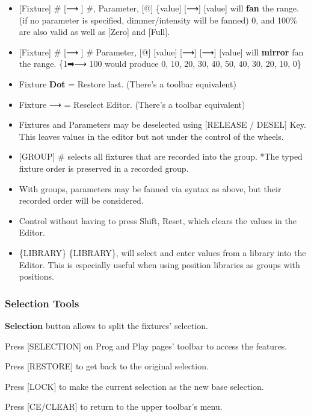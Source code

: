 \documentclass[
]{article}
\begin{document}
\begin{itemize}
\item
  {[}Fixture{]} \# {[}⟶ {]} \#, Parameter, {[}@{]} \{value{]} {[}⟶{]} {[}value{]} will \textbf{fan} the range. (if no parameter is specified, dimmer/intensity will be fanned) 0, and 100\% are also valid as well as {[}Zero{]} and {[}Full{]}.
\item
  {[}Fixture{]} \# {[}⟶ {]} \# Parameter, {[}@{]} {[}value{]} {[}⟶{]} {[}⟶{]} {[}value{]} will \textbf{mirror} fan the range. \{1➡⟶ 100 would produce 0, 10, 20, 30, 40, 50, 40, 30, 20, 10, 0\}
\item
  Fixture \textbf{Dot} = Restore last. (There's a toolbar equivalent)
\item
  Fixture ⟶ = Reselect Editor. (There's a toolbar equivalent)
\item
  Fixtures and Parameters may be deselected using {[}RELEASE / DESEL{]} Key. This leaves values in the editor but not under the control of the wheels.
\item
  {[}GROUP{]} \# selects all fixtures that are recorded into the group. *The typed fixture order is preserved in a recorded group.
\item
  With groups, parameters may be fanned via syntax as above, but their recorded order will be considered.
\item
  Control without having to press Shift, Reset, which clears the values in the Editor.
\item
  \{LIBRARY\} \{LIBRARY\}, will select and enter values from a library into the Editor. This is especially useful when using position libraries as groups with positions.
\end{itemize}

\hypertarget{selection-tools}{%
\subsubsection{Selection Tools}\label{selection-tools}}

\textbf{Selection} button allows to split the fixtures' selection.

Press {[}SELECTION{]} on Prog and Play pages' toolbar to access the features.

Press {[}RESTORE{]} to get back to the original selection.

Press {[}LOCK{]} to make the current selection as the new base selection.

Press {[}CE/CLEAR{]} to return to the upper toolbar's menu.
\end{document}
